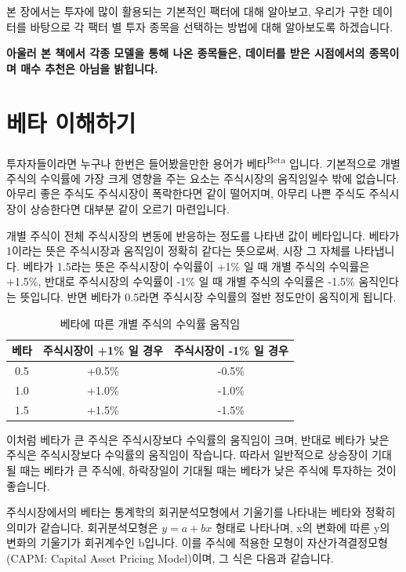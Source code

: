 \documentclass[12pt,]{book}
\begin{document}
본 장에서는 투자에 많이 활용되는 기본적인 팩터에 대해 알아보고, 우리가 구한 데이터를 바탕으로 각 팩터 별 투자 종목을 선택하는 방법에 대해 알아보도록 하겠습니다.

\textbf{아울러 본 책에서 각종 모델을 통해 나온 종목들은, 데이터를 받은 시점에서의 종목이며 매수 추천은 아님을 밝힙니다.}

\hypertarget{section-46}{%
\section{베타 이해하기}\label{section-46}}

투자자들이라면 누구나 한번은 들어봤을만한 용어가 베타\textsuperscript{Beta} 입니다. 기본적으로 개별 주식의 수익률에 가장 크게 영향을 주는 요소는 주식시장의 움직임일수 밖에 없습니다. 아무리 좋은 주식도 주식시장이 폭락한다면 같이 떨어지며, 아무리 나쁜 주식도 주식시장이 상승한다면 대부분 같이 오르기 마련입니다.

개별 주식이 전체 주식시장의 변동에 반응하는 정도를 나타낸 값이 베타입니다. 베타가 1이라는 뜻은 주식시장과 움직임이 정확히 같다는 뜻으로써, 시장 그 자체를 나타냅니다. 베타가 1.5라는 뜻은 주식시장이 수익률이 +1\% 일 때 개별 주식의 수익률은 +1.5\%, 반대로 주식시장의 수익률이 -1\% 일 때 개별 주식의 수익률은 -1.5\% 움직인다는 뜻입니다. 반면 베타가 0.5라면 주식시장 수익률의 절반 정도만이 움직이게 됩니다.

\begin{table}[!h]

\caption{\label{tab:unnamed-chunk-4}베타에 따른 개별 주식의 수익률 움직임}
\centering
\begin{tabular}{ccc}
\toprule
베타 & 주식시장이 +1\% 일 경우 & 주식시장이 -1\% 일 경우\\
\midrule
\rowcolor{gray!6}  0.5 & +0.5\% & -0.5\%\\
1.0 & +1.0\% & -1.0\%\\
\rowcolor{gray!6}  1.5 & +1.5\% & -1.5\%\\
\bottomrule
\end{tabular}
\end{table}

이처럼 베타가 큰 주식은 주식시장보다 수익률의 움직임이 크며, 반대로 베타가 낮은 주식은 주식시장보다 수익률의 움직임이 작습니다. 따라서 일반적으로 상승장이 기대될 때는 베타가 큰 주식에, 하락장일이 기대될 때는 베타가 낮은 주식에 투자하는 것이 좋습니다.

주식시장에서의 베타는 통계학의 회귀분석모형에서 기울기를 나타내는 베타와 정확히 의미가 같습니다. 회귀분석모형은 \(y = a + bx\) 형태로 나타나며, x의 변화에 따른 y의 변화의 기울기가 회귀계수인 b입니다. 이를 주식에 적용한 모형이 자산가격결정모형(CAPM: Capital Asset Pricing Model)이며, 그 식은 다음과 같습니다.
\end{document}
